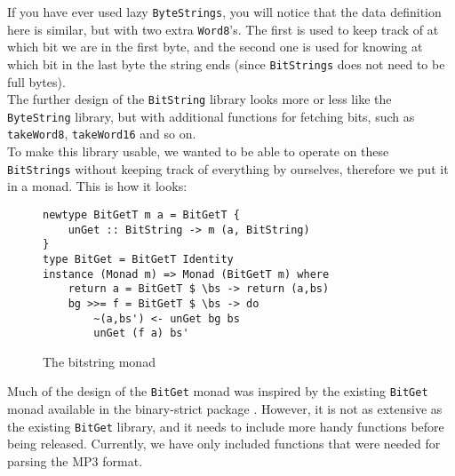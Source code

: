 \documentclass[a4paper,12pt]{article}
\begin{document}
        If you have ever used lazy \texttt{ByteStrings}, you will notice that
        the data definition here is similar, but with two extra
        \texttt{Word8}'s. The first is used to keep track of at which bit we are
        in the first byte, and the second one is used for knowing at which bit
        in the last byte the string ends (since \texttt{BitStrings} does not
        need to be full bytes). \\ The further design of the \texttt{BitString}
        library looks more or less like the \texttt{ByteString} library, but
        with additional functions for fetching bits, such as \texttt{takeWord8},
        \texttt{takeWord16} and so on. \\

        To make this library usable, we wanted to be able to operate on these
        \texttt{BitStrings} without keeping track of everything by ourselves,
        therefore we put it in a monad. This is how it looks:

\begin{figure}[h]
  \begin{center}
        \begin{lstlisting}
newtype BitGetT m a = BitGetT {
    unGet :: BitString -> m (a, BitString)
}
type BitGet = BitGetT Identity
instance (Monad m) => Monad (BitGetT m) where
    return a = BitGetT $ \bs -> return (a,bs)
    bg >>= f = BitGetT $ \bs -> do
        ~(a,bs') <- unGet bg bs
        unGet (f a) bs'
    \end{lstlisting}
    \caption{The bitstring monad}\label{fig:bitstringmonad}
  \end{center}
\end{figure}

    Much of the design of the \texttt{BitGet} monad was inspired by the existing
    \texttt{BitGet} monad available in the binary-strict package
    \cite{binarystrict}. However, it is not as extensive as the existing
    \texttt{BitGet} library, and it needs to include more handy functions before
    being released. Currently, we have only included functions that were needed
    for parsing the MP3 format.
\end{document}
